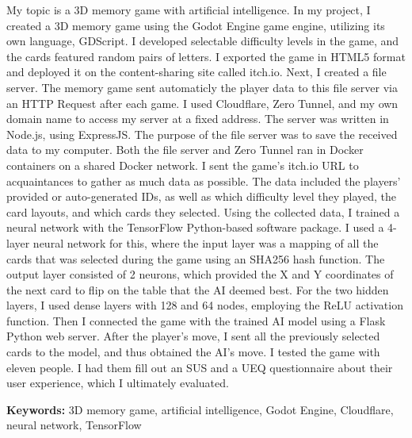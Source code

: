 \vspace{8pt}
My topic is a 3D memory game with artificial intelligence.
In my project, I created a 3D memory game using the Godot Engine game engine, utilizing its own language, GDScript. I developed selectable difficulty levels in the game, and the cards featured random pairs of letters.
I exported the game in HTML5 format and deployed it on the content-sharing site called itch.io.
Next, I created a file server. The memory game sent automaticly the player data to this file server via an HTTP Request after each game. I used Cloudflare, Zero Tunnel, and my own domain name to access my server at a fixed address.
The server was written in Node.js, using ExpressJS. The purpose of the file server was to save the received data to my computer.
Both the file server and Zero Tunnel ran in Docker containers on a shared Docker network.
I sent the game’s itch.io URL to acquaintances to gather as much data as possible.
The data included the players’ provided or auto-generated IDs, as well as which difficulty level they played, the card layouts, and which cards they selected.
Using the collected data, I trained a neural network with the TensorFlow Python-based software package.
I used a 4-layer neural network for this, where the input layer was a mapping of all the cards that was selected during the game using an SHA256 hash function.
The output layer consisted of 2 neurons, which provided the X and Y coordinates of the next card to flip on the table that the AI deemed best.
For the two hidden layers, I used dense layers with 128 and 64 nodes, employing the ReLU activation function.
Then I connected the game with the trained AI model using a Flask Python web server.
After the player’s move, I sent all the previously selected cards to the model, and thus obtained the AI’s move.
I tested the game with eleven people. I had them fill out an SUS and a UEQ questionnaire about their user experience, which I ultimately evaluated.
\vspace{8pt}


\textbf{Keywords: }3D memory game, artificial intelligence, Godot Engine, Cloudflare, neural network, TensorFlow